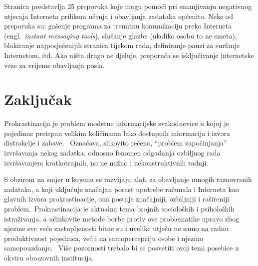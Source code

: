 \documentclass[11pt,twocolumn,english]{article}
\newcommand{\engl}[1]{(engl.~\emph{#1})}
\begin{document}
Stranica \cite{ColDeg25ways} predstavlja 25 preporuka koje mogu
pomoći pri smanjivanju negativnog utjecaja Interneta prilikom učenja i obavljanja
zadataka općenito. Neke od preporuka su: gašenje programa za trenutnu
komunikaciju preko Interneta \engl{instant messaging tools}, slušanje glazbe
(ukoliko osobu to ne smeta), blokiranje najposjećenijih stranica tijekom rada,
definiranje pauzi za surfanje Internetom, itd. Ako ništa drugo ne djeluje,
preporuča se isključivanje internetske veze za vrijeme obavljanja posla.

\section{Zaključak}

Prokrastinacija je problem moderne informacijske svakodnevice u kojoj 
je pojedinac pretrpan velikim količinama lako dostupnih  informacija i 
izvora distrakcije i zabave.~ Označava, slikovito rečeno, ``problem započinjanja'' 
izvršavanja nekog zadatka, odnosno fenomen odgađanja ozbiljnog rada 
izvršavanjem kratkotrajnih, no ne nužno i nekonstruktivnih radnji. 

S obzirom na smjer u kojemu se razvijaju alati za obavljanje mnogih raznovrsnih 
zadataka, a koji uključuje značajan porast upotrebe računala i Interneta kao glavnih 
izvora prokrastinacije, ona postaje značajniji, ozbiljniji i rašireniji problem.~Prokrastinacija 
je aktualna tema brojnih socioloških i psiholoških 
istraživanja, a učinkovite metode borbe protiv ove problematike upravo zbog 
njezine sve veće zastupljenosti bitne su i uvelike utječu ne samo na radnu produktivnost 
pojednica, već i na samopercepciju osobe i njezino samopouzdanje.~ Više pozornosti 
trebalo bi se posvetiti ovoj temi posebice u okviru obrazovnih institucija.~



\end{document}
